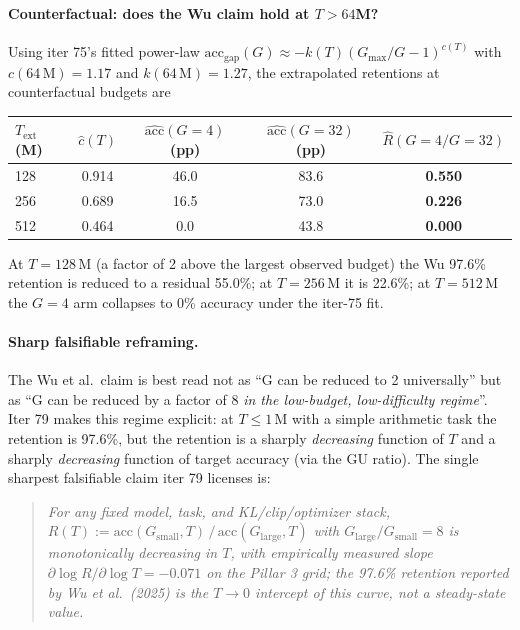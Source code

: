 \paragraph{Counterfactual: does the Wu claim hold at $T > 64$M?}
Using iter 75's fitted power-law
$\mathrm{acc}_{\mathrm{gap}}(G) \approx -k(T)(G_{\mathrm{max}}/G - 1)^{c(T)}$
with $c(64\,\mathrm{M}){=}1.17$ and $k(64\,\mathrm{M}){=}1.27$, the
extrapolated retentions at counterfactual budgets are

\begin{center}
\small
\begin{tabular}{lcccc}
\toprule
$T_{\mathrm{ext}}$ (M) & $\hat c(T)$ & $\hat{\mathrm{acc}}(G{=}4)$ (pp)
                       & $\hat{\mathrm{acc}}(G{=}32)$ (pp)
                       & $\hat R(G{=}4/G{=}32)$ \\
\midrule
 128 & 0.914 & 46.0 & 83.6 & \textbf{0.550} \\
 256 & 0.689 & 16.5 & 73.0 & \textbf{0.226} \\
 512 & 0.464 &  0.0 & 43.8 & \textbf{0.000} \\
\bottomrule
\end{tabular}
\end{center}

\noindent
At $T{=}128\,\mathrm{M}$ (a factor of 2 above the largest observed
budget) the Wu 97.6\% retention is reduced to a residual 55.0\%;
at $T{=}256\,\mathrm{M}$ it is 22.6\%; at $T{=}512\,\mathrm{M}$ the
$G{=}4$ arm collapses to 0\% accuracy under the iter-75 fit.

\paragraph{Sharp falsifiable reframing.}
The Wu et al.\ claim is best read not as ``G can be reduced to 2
universally'' but as ``G can be reduced by a factor of 8 \emph{in
the low-budget, low-difficulty regime}''.  Iter 79 makes this
regime explicit: at $T \le 1\,\mathrm{M}$ with a simple arithmetic
task the retention is 97.6\%, but the retention is a sharply
\emph{decreasing} function of $T$ and a sharply \emph{decreasing}
function of target accuracy (via the GU ratio).  The single
sharpest falsifiable claim iter 79 licenses is:

\begin{quote}
\emph{For any fixed model, task, and KL/clip/optimizer stack,
$R(T) := \mathrm{acc}(G_{\mathrm{small}}, T)\,/\,\mathrm{acc}(G_{\mathrm{large}}, T)$
with $G_{\mathrm{large}}/G_{\mathrm{small}}{=}8$ is monotonically
decreasing in $T$, with empirically measured slope
$\partial \log R / \partial \log T = -0.071$ on the Pillar 3 grid;
the 97.6\% retention reported by Wu et al.\ (2025) is the
$T{\to}0$ intercept of this curve, not a steady-state value.}
\end{quote}

